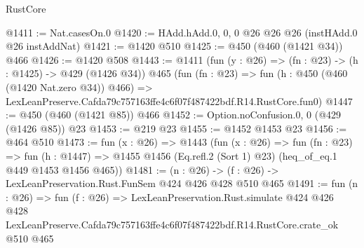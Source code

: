 \begin{lexlean}{RustCore}
\begin{coremodule}
@1411 := Nat.casesOn.{0}
@1420 := HAdd.hAdd.{0, 0, 0} @26 @26 @26 (instHAdd.{0} @26 instAddNat)
@1421 := @1420 @510
@1425 := @450 (@460 (@1421 @34)) @466
@1426 := @1420 @508
@1443 := @1411
    (fun (y : @26) => (fn : @23) -> (h : @1425) -> @429 (@1426 @34))
    @465
    (fun (fn : @23) =>
    fun (h : @450 (@460 (@1420 Nat.zero @34)) @466) =>
    LexLeanPreserve.Cafda79c757163ffe4c6f07f487422bdf.R14.RustCore.fun0)
@1447 := @450 (@460 (@1421 @85)) @466
@1452 := Option.noConfusion.{0, 0} (@429 (@1426 @85)) @23
@1453 := @219 @23
@1455 := @1452 @1453 @23
@1456 := @464 @510
@1473 := fun (x : @26) =>
  @1443
    (fun (x : @26) =>
    fun (fn : @23) =>
    fun (h : @1447) => @1455 @1456 (Eq.refl.{2} (Sort 1) @23) (heq_of_eq.{1} @449 @1453 @1456 @465))
@1481 := (n : @26) -> (f : @26) -> LexLeanPreservation.Rust.FunSem @424 @426 @428 @510 @465
@1491 := fun (n : @26) =>
  fun (f : @26) =>
  LexLeanPreservation.Rust.simulate
    @424
    @426
    @428
    LexLeanPreserve.Cafda79c757163ffe4c6f07f487422bdf.R14.RustCore.crate_ok
    @510
    @465
\end{coremodule}
\end{lexlean}
